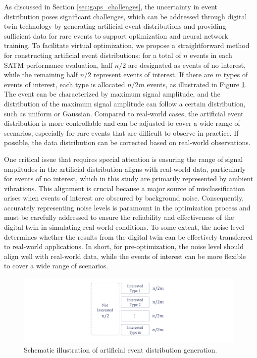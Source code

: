 \documentclass[a4paper,fleqn,numbers,sort&compress]{cas-sc}
\begin{document}
As discussed in Section \ref{sec:gaps_challenges}, the uncertainty in event distribution poses significant challenges, which can be addressed through digital twin technology by generating artificial event distributions and providing sufficient data for rare events to support optimization and neural network training. To facilitate virtual optimization, we propose a straightforward method for constructing artificial event distributions: for a total of $n$ events in each SATM performance evaluation, half $n/2$ are designated as events of no interest, while the remaining half $n/2$ represent events of interest. If there are $m$ types of events of interest, each type is allocated $n/2m$ events, as illustrated in Figure \ref{fig:Artificial Event Distribution}. The event can be characterized by maximum signal amplitude, and the distribution of the maximum signal amplitude can follow a certain distribution, such as uniform or Gaussian. Compared to real-world cases, the artificial event distribution is more controllable and can be adjusted to cover a wide range of scenarios, especially for rare events that are difficult to observe in practice. If possible, the data distribution can be corrected based on real-world observations. 

One critical issue that requires special attention is ensuring the range of signal amplitudes in the artificial distribution aligns with real-world data, particularly for events of no interest, which in this study are primarily represented by ambient vibrations. This alignment is crucial because a major source of misclassification arises when events of interest are obscured by background noise. Consequently, accurately representing noise levels is paramount in the optimization process and must be carefully addressed to ensure the reliability and effectiveness of the digital twin in simulating real-world conditions.
To some extent, the noise level determines whether the results from the digital twin can be effectively transferred to real-world applications. In short, for pre-optimization, the noise level should align well with real-world data, while the events of interest can be more flexible to cover a wide range of scenarios.

\begin{figure}[htbp]
    \centering
    \includegraphics[width=\linewidth]{Fig7.jpg}
    \caption{Schematic illustration of artificial event distribution generation.}
    \label{fig:Artificial Event Distribution}
\end{figure}
\end{document}
